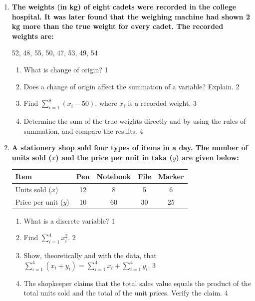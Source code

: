 \documentclass[12pt]{article}
\begin{document}
\begin{enumerate}

\item
\textbf{The weights (in kg) of eight cadets were recorded in the college hospital. It was later found that the weighing machine had shown 2 kg more than the true weight for every cadet. The recorded weights are:}
\begin{center}
52, 48, 55, 50, 47, 53, 49, 54
\end{center}
\begin{enumerate}
  \item What is change of origin? \hfill 1
  \item Does a change of origin affect the summation of a variable? Explain. \hfill 2
  \item Find $\displaystyle \sum_{i=1}^{8} (x_i-50)$, where $x_i$ is a recorded weight. \hfill 3
  \item Determine the sum of the true weights directly and by using the rules of summation, and compare the results. \hfill 4
\end{enumerate}

\item
\textbf{A stationery shop sold four types of items in a day. The number of units sold ($x$) and the price per unit in taka ($y$) are given below:}
\begin{center}
\begin{tabular}{l|c|c|c|c}
Item & Pen & Notebook & File & Marker \\ \hline
Units sold ($x$) & 12 & 8 & 5 & 6 \\ \hline
Price per unit ($y$) & 10 & 60 & 30 & 25
\end{tabular}
\end{center}
\begin{enumerate}
  \item What is a discrete variable? \hfill 1
  \item Find $\displaystyle \sum_{i=1}^{4} x_i^2$. \hfill 2
  \item Show, theoretically and with the data, that $\displaystyle \sum_{i=1}^{4} (x_i+y_i) = \sum_{i=1}^{4}x_i + \sum_{i=1}^{4}y_i$. \hfill 3
  \item The shopkeeper claims that the total sales value equals the product of the total units sold and the total of the unit prices. Verify the claim. \hfill 4
\end{enumerate}


\end{enumerate}
\end{document}
